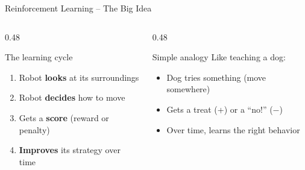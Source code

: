 \documentclass[aspectratio=169, 11pt]{beamer}
\begin{document}
\begin{frame}{Reinforcement Learning -- The Big Idea}
  \begin{columns}[T]
    \begin{column}{0.48\textwidth}
      \begin{block}{The learning cycle}
        \begin{enumerate}\small
          \item Robot \textbf{looks} at its surroundings
          \item Robot \textbf{decides} how to move
          \item Gets a \textbf{score} (reward or penalty)
          \item \textbf{Improves} its strategy over time
        \end{enumerate}
      \end{block}
    \end{column}
    \begin{column}{0.48\textwidth}
      \begin{exampleblock}{Simple analogy}
        Like teaching a dog:\vspace{-0.2em}
        \begin{itemize}\small
          \item Dog tries something (move somewhere)
          \item Gets a treat (+) or a ``no!'' ($-$)
          \item Over time, learns the right behavior
        \end{itemize}
      \end{exampleblock}
    \end{column}
  \end{columns}
\end{frame}
\end{document}

